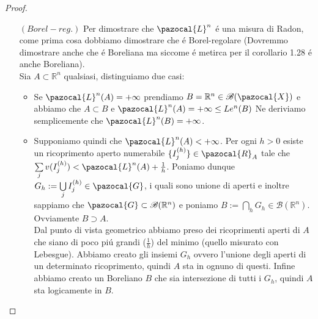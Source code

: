 \documentclass[11pt,a4paper]{report}
\theoremstyle{plain}
\theoremstyle{definition}
\newcommand{\X}{\pazocal{X}}
\newcommand{\G}{\pazocal{G}}
\newcommand{\Le}{\pazocal{L}}
\newcommand{\B}{\mathcal{B}}
\begin{document}
\begin{proof}
\begin{itemize}
\begin{itemize}
\[	\]
	Passando ora alla misura:
	\[
		\Le^n(A) + \Le^n(B) \le \sum\limits_{h\in H_A}v(J_h) + \sum\limits_{h\in H_B}v(J_h) \le
	\]
	\[
		\le \sum\limits_{h \in H} v(J_h) \le \sum\limits_{i,j}v(I_i^{(j)}) = \sum\limits_j\sum\limits_iv(I_i^{(j)})	
	\]
	Ora per la seconda propriet\'a descritta in equazione 1.19 otteniamo :
	\[
		\sum\limits_j\sum\limits_iv(I_i^{(j)})	 \le \sum\limits_jv(I_j) + \frac{\varepsilon}{2^j} \le \sum\limits_{j}v(I_j) + \varepsilon	
	\]
	Ora consideriamo quanto descritto nell' equazione 1.18 e troviamo che:
	\[
		\sum\limits_{j}v(I_j) + \varepsilon \le \Le^n(A\cup B) + 2\varepsilon
	\]
	Allora riassumendo il tutto:
	\begin{equation}
		\Le^n(A) + \Le^n(B) \le \Le^n(A\cup B) + 2\varepsilon\ \ \forall \varepsilon
	\end{equation}
	Quindi per l'arbitrariet\'a di $\varepsilon$ otteniamo la tesi.
		\end{itemize}
		\item[$(Borel-reg.)$] Per dimostrare che $\Le^n$ \'e una misura di Radon, come prima cosa dobbiamo dimostrare che \'e Borel-regolare (Dovremmo dimostrare anche che \'e Boreliana ma siccome \'e metirca per il corollario 1.28 \'e anche Boreliana).\\
		Sia $A \subset \mathbb{R}^n$ qualsiasi, distinguiamo due casi:
		\begin{itemize}
			\item Se $\Le^n(A) = + \infty$ prendiamo $B = \mathbb{R}^n \in \B(\X)$ e abbiamo che $A \subset B$ e $\Le^n(A) = + \infty \le \\Le^n(B)$ Ne deriviamo semplicemente che $\Le^n(B) = +\infty$.
			\item Supponiamo quindi che $\Le^n(A) < + \infty$. Per ogni $h > 0$ esiste un ricoprimento aperto numerabile $\{I_j^{(h)}\} \in \pazocal{R}_A$ tale che $\sum\limits_jv(I_j^{(h)}) < \Le^n(A)+\frac{1}{h}$. Poniamo dunque $G_h := \bigcup\limits_jI_j^{(h)} \in \G$, i quali sono unione di aperti e inoltre sappiamo che $\G \subset \B(\mathbb{R}^n)$ e poniamo $B := \bigcap\limits_hG_h \in \B(\mathbb{R}^n)$. Ovviamente $B\supset A$.\\
			Dal punto di vista geometrico abbiamo preso dei ricoprimenti aperti di $A$ che siano di poco pi\'u grandi ($\frac{1}{h}$) del minimo (quello misurato con Lebesgue). Abbiamo creato gli insiemi $G_h$ ovvero l'unione degli aperti di un determinato ricoprimento, quindi $A$ sta in ognuno di questi. Infine abbiamo creato un Boreliano  $B$ che sia intersezione di tutti i $G_h$, quindi $A$ sta logicamente in $B$.\\

\end{itemize}
\end{itemize}
\end{proof}
\end{document}
